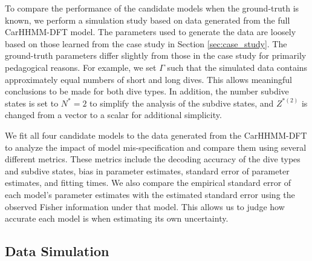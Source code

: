 

To compare the performance of the candidate models when the ground-truth is known, we perform a simulation study based on data generated from the full CarHHMM-DFT model. The parameters used to generate the data are loosely based on those learned from the case study in Section \ref{sec:case_study}. The ground-truth parameters differ slightly from those in the case study for primarily pedagogical reasons. For example, we set $\Gamma$ such that the simulated data contains approximately equal numbers of short and long dives. This allows meaningful conclusions to be made for both dive types. In addition, the number subdive states is set to $N^*=2$ to simplify the analysis of the subdive states, and $Z^{*(2)}$ is changed from a vector to a scalar for additional simplicity. 

We fit all four candidate models to the data generated from the CarHHMM-DFT to analyze the impact of model mis-specification and compare them using several different metrics. These metrics include the decoding accuracy of the dive types and subdive states, bias in parameter estimates, standard error of parameter estimates, and fitting times. We also compare the empirical standard error of each model's parameter estimates with the estimated standard error using the observed Fisher information under that model. This allows us to judge how accurate each model is when estimating its own uncertainty.

\subsection{Data Simulation}

